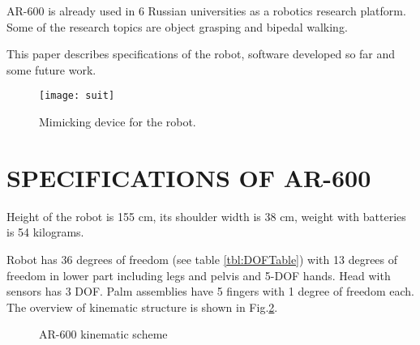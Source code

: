 \documentclass[letterpaper, 10 pt, conference]{ieeeconf}  %
\begin{document}
AR-600 is already used in 6 Russian universities as a robotics research
platform. Some of the research topics are object grasping and bipedal walking.

This paper describes specifications of the robot, software developed so far and
some future work.

\begin{figure} [thpb]
      \centering
      
      \texttt{[image: suit]}
      \caption{Mimicking device for the robot.}
      \label{img:suit}
\end{figure}

\section{SPECIFICATIONS OF AR-600}

Height of the robot is 155 cm, its shoulder width is 38 cm, weight with
batteries is 54 kilograms.

Robot has 36 degrees of freedom (see table \ref{tbl:DOFTable}) with 13 degrees
of freedom in lower part including legs and pelvis and 5-DOF hands. Head with sensors has 3 DOF. Palm assemblies have 5
fingers with 1 degree of freedom each.
The overview of kinematic structure is shown in Fig.\ref{img:kinematic}.

 \begin{figure}[thpb]
      \centering
      \caption{AR-600 kinematic scheme}
      \label{img:kinematic}
   \end{figure}
 
\end{document}
